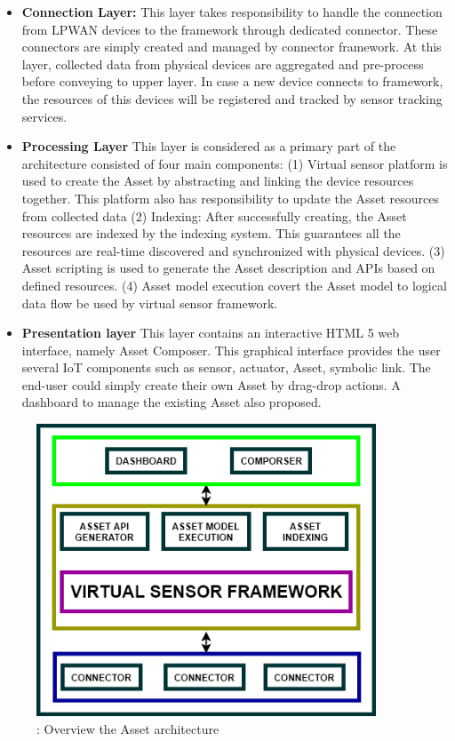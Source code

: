 \begin{itemize}
	\item \textbf{Connection Layer:} This layer takes responsibility to handle the connection from LPWAN devices to the framework through dedicated connector. These connectors are simply created and managed by connector framework. At this layer, collected data from physical devices are aggregated and pre-process before conveying to upper layer. In case a new device connects to framework, the resources of this devices will be registered and tracked by sensor tracking services. 
	\item \textbf{Processing Layer} This layer is considered as a primary part of the architecture consisted of four main components: 
	(1) Virtual sensor platform is used to create the Asset by abstracting and linking the device resources together. This platform also has responsibility to update the Asset resources from collected data
	(2) Indexing: After successfully creating, the Asset resources are indexed by the indexing system. This guarantees all the resources are real-time discovered and synchronized with physical devices. 
	(3) Asset scripting is used to generate the Asset description and APIs based on defined resources. 
	(4) Asset model execution covert the Asset model to logical data flow \cite{kim2017scalable} be used by virtual sensor framework.
	\item \textbf{Presentation layer} This layer contains an interactive HTML 5 web interface, namely Asset Composer. This graphical interface provides the user several IoT components such as sensor, actuator, Asset, symbolic link. The end-user could simply create their own Asset by drag-drop actions. A dashboard to manage the existing Asset also proposed.
\end{itemize}
\begin{figure}[h]
	\centering
	\includegraphics[width=0.9\textwidth]{./Part2/Chapter6/figures/overview_architecture.png}
	\caption{ : Overview the Asset architecture}
	\label{fig: Overview the Asset architecture}
\end{figure}
